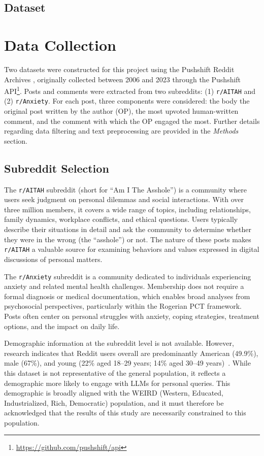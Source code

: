 \subsection{Dataset}
\section{Data Collection}

Two datasets were constructed for this project using the Pushshift Reddit Archives \cite{pushshift}, originally collected between 2006 and 2023 through the Pushshift API\footnote{\url{https://github.com/pushshift/api}}. Posts and comments were extracted from two subreddits: (1) \texttt{r/AITAH} and (2) \texttt{r/Anxiety}. For each post, three components were considered: the body the original post written by the author (OP), the most upvoted human-written comment, and the comment with which the OP engaged the most. Further details regarding data filtering and text preprocessing are provided in the \emph{Methods} section.  

\subsection{Subreddit Selection}

The \texttt{r/AITAH} subreddit (short for ``Am I The Asshole'') is a community where users seek judgment on personal dilemmas and social interactions. With over three million members, it covers a wide range of topics, including relationships, family dynamics, workplace conflicts, and ethical questions. Users typically describe their situations in detail and ask the community to determine whether they were in the wrong (the ``asshole'') or not. The nature of these posts makes \texttt{r/AITAH} a valuable source for examining behaviors and values expressed in digital discussions of personal matters.  

The \texttt{r/Anxiety} subreddit is a community dedicated to individuals experiencing anxiety and related mental health challenges. Membership does not require a formal diagnosis or medical documentation, which enables broad analyses from psychosocial perspectives, particularly within the Rogerian PCT framework. Posts often center on personal struggles with anxiety, coping strategies, treatment options, and the impact on daily life.

Demographic information at the subreddit level is not available. However, research indicates that Reddit users overall are predominantly American (49.9\%), male (67\%), and young (22\% aged 18--29 years; 14\% aged 30--49 years)~\cite{pew-reddit-research,statista-reddit}. While this dataset is not representative of the general population, it reflects a demographic more likely to engage with LLMs for personal queries. This demographic is broadly aligned with the WEIRD (Western, Educated, Industrialized, Rich, Democratic) population, and it must therefore be acknowledged that the results of this study are necessarily constrained to this population.

